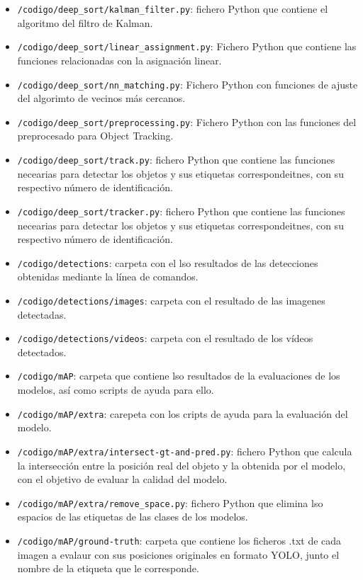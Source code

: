 \begin{itemize}
    \item \texttt{/codigo/deep\_sort/kalman\_filter.py}: fichero Python que contiene el algoritmo del filtro de Kalman\cite{kalman_filter}.  
    \item \texttt{/codigo/deep\_sort/linear\_assignment.py}: Fichero Python que contiene las funciones relacionadas con la asignación linear.
    \item \texttt{/codigo/deep\_sort/nn\_matching.py}: Fichero Python con funciones de ajuste del algorimto de vecinos más cercanos\cite{knn}.
    \item \texttt{/codigo/deep\_sort/preprocessing.py}: Fichero Python con las funciones del preprocesado para Object Tracking.
    \item \texttt{/codigo/deep\_sort/track.py}: fichero Python que contiene las funciones necearias para detectar los objetos y sus etiquetas correspondeitnes, con su respectivo número de identificación.
    \item \texttt{/codigo/deep\_sort/tracker.py}: fichero Python que contiene las funciones necearias para detectar los objetos y sus etiquetas correspondeitnes, con su respectivo número de identificación.
    \item \texttt{/codigo/detections}: carpeta con el lso resultados de las detecciones obtenidas mediante la línea de comandos.
    \item \texttt{/codigo/detections/images}: carpeta con el resultado de las imagenes detectadas.
    \item \texttt{/codigo/detections/videos}: carpeta con el resultado de los vídeos detectados.
    \item \texttt{/codigo/mAP}: carpeta que contiene lso resultados de la evaluaciones de los modelos, así como scripts de ayuda para ello.
    \item \texttt{/codigo/mAP/extra}: carepeta con los cripts de ayuda para la evaluación del modelo.
    \item \texttt{/codigo/mAP/extra/intersect-gt-and-pred.py}: fichero Python que calcula la intersección entre la posición real del objeto y la obtenida por el modelo, con el objetivo de evaluar la calidad del modelo.
    \item \texttt{/codigo/mAP/extra/remove\_space.py}: fichero Python que elimina lso espacios de las etiquetas de las clases de los modelos.
    \item \texttt{/codigo/mAP/ground-truth}: carpeta que contiene los ficheros .txt de cada imagen a evalaur con sus posiciones originales en formato YOLO, junto el nombre de la etiqueta que le corresponde.

\end{itemize}
